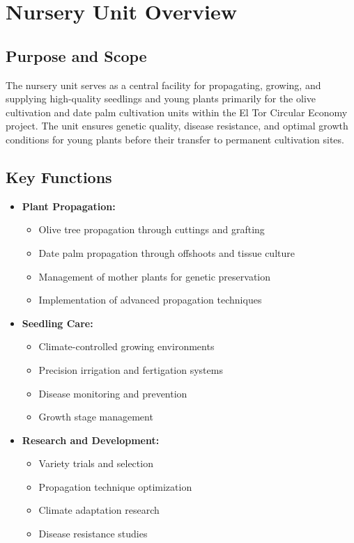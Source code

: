\section{Nursery Unit Overview}

\subsection{Purpose and Scope}
The nursery unit serves as a central facility for propagating, growing, and supplying high-quality seedlings and young plants primarily for the olive cultivation and date palm cultivation units within the El Tor Circular Economy project. The unit ensures genetic quality, disease resistance, and optimal growth conditions for young plants before their transfer to permanent cultivation sites.

\subsection{Key Functions}
\begin{itemize}
    \item \textbf{Plant Propagation:}
    \begin{itemize}
        \item Olive tree propagation through cuttings and grafting
        \item Date palm propagation through offshoots and tissue culture
        \item Management of mother plants for genetic preservation
        \item Implementation of advanced propagation techniques
    \end{itemize}
    
    \item \textbf{Seedling Care:}
    \begin{itemize}
        \item Climate-controlled growing environments
        \item Precision irrigation and fertigation systems
        \item Disease monitoring and prevention
        \item Growth stage management
    \end{itemize}
    
    \item \textbf{Research and Development:}
    \begin{itemize}
        \item Variety trials and selection
        \item Propagation technique optimization
        \item Climate adaptation research
        \item Disease resistance studies
    \end{itemize}
\end{itemize}

